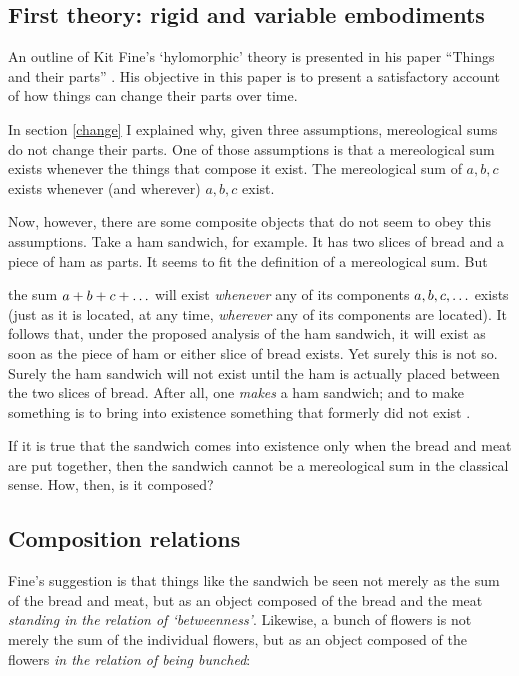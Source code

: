 \documentclass[11pt]{article}
\newenvironment{squote}{%
\begin{spacing}{1}
\begin{list}{}{%
\setlength{\labelwidth}{0pt}%
\rightmargin\leftmargin%
}
\item\relax
}{%
\end{list}%
\end{spacing}
}
\begin{document}
\begin{spacing}{1.5}
\section{First theory: rigid and variable embodiments}
\label{fine-h}
An outline of Kit Fine's `hylomorphic' theory is presented in his
paper ``Things and their parts'' \citeyearpar{fine1999}.  His
objective in this paper is to present a satisfactory account of how
things can change their parts over time.

In section \ref{change} I explained why, given three assumptions,
mereological sums do not change their parts.  One of those assumptions
is that a mereological sum exists whenever the things that compose it
exist.  The mereological sum of $a, b, c$ exists whenever (and
wherever) $a, b, c$ exist.

Now, however, there are some composite objects that do not seem to
obey this assumptions.  Take a ham sandwich, for example.  It has two
slices of bread and a piece of ham as parts.  It seems to fit the
definition of a mereological sum.  But

\begin{squote}
the sum $a + b + c + \mathellipsis $ will exist {\em whenever} any of
its components $a, b, c, \mathellipsis $ exists (just as it is
located, at any time, {\em wherever} any of its components are
located).  It follows that, under the proposed analysis of the ham
sandwich, it will exist as soon as the piece of ham or either slice of
bread exists.  Yet surely this is not so.  Surely the ham sandwich
will not exist until the ham is actually placed between the two slices
of bread.  After all, one {\em makes} a ham sandwich; and to make
something is to bring into existence something that formerly did not
exist \citep[62]{fine1999}.
\end{squote}

If it is true that the sandwich comes into existence only when the
bread and meat are put together, then the sandwich cannot be a
mereological sum in the classical sense.  How, then, is it composed?

\subsection{Composition relations}
\label{rigid}
Fine's suggestion is that things like the sandwich be seen not merely
as the sum of the bread and meat, but as an object composed of the
bread and the meat {\em standing in the relation of `betweenness'}.
Likewise, a bunch of flowers is not merely the sum of the individual
flowers, but as an object composed of the flowers {\em in the relation
  of being bunched}:


\end{spacing}
\end{document}
